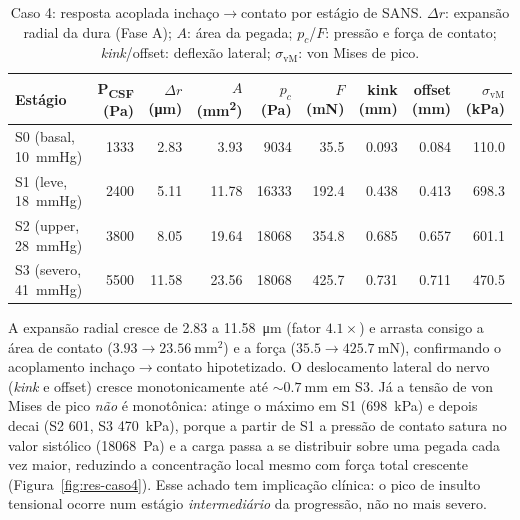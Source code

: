 \begin{table}[h!]
\centering
\small
\caption{Caso 4: resposta acoplada inchaço$\to$contato por estágio de SANS.
$\Delta r$: expansão radial da dura (Fase A); $A$: área da pegada; $p_c$/$F$:
pressão e força de contato; \emph{kink}/offset: deflexão lateral;
$\sigma_{\mathrm{vM}}$: von Mises de pico.}
\label{tab:res-caso4}
\begin{tabular}{l r r r r r r r r}
\toprule
\textbf{Estágio} & \makecell{P\textsubscript{CSF}\\(\si{\pascal})} & \makecell{$\Delta r$\\(\si{\micro\meter})} & \makecell{$A$\\(\si{\milli\meter\squared})} & \makecell{$p_c$\\(\si{\pascal})} & \makecell{$F$\\(\si{\milli\newton})} & \makecell{kink\\(\si{\milli\meter})} & \makecell{offset\\(\si{\milli\meter})} & \makecell{$\sigma_{\mathrm{vM}}$\\(\si{\kilo\pascal})} \\
\midrule
S0 (basal, \SI{10}{mmHg}) & 1333 & 2.83  & 3.93  & 9034  & 35.5  & 0.093 & 0.084 & 110.0 \\
S1 (leve, \SI{18}{mmHg})  & 2400 & 5.11  & 11.78 & 16333 & 192.4 & 0.438 & 0.413 & 698.3 \\
S2 (upper, \SI{28}{mmHg}) & 3800 & 8.05  & 19.64 & 18068 & 354.8 & 0.685 & 0.657 & 601.1 \\
S3 (severo, \SI{41}{mmHg}) & 5500 & 11.58 & 23.56 & 18068 & 425.7 & 0.731 & 0.711 & 470.5 \\
\bottomrule
\end{tabular}
\end{table}

A expansão radial cresce de \SI{2.83}{} a \SI{11.58}{\micro\meter} (fator $4.1\times$) e arrasta consigo a área de contato ($3.93 \to \SI{23.56}{\milli\meter\squared}$) e a força ($35.5 \to \SI{425.7}{\milli\newton}$), confirmando o acoplamento inchaço$\to$contato hipotetizado. O deslocamento lateral do nervo (\emph{kink} e offset) cresce monotonicamente até $\sim\SI{0.7}{\milli\meter}$ em S3. Já a tensão de von Mises de pico \emph{não} é monotônica: atinge o máximo em S1 (\SI{698}{\kilo\pascal}) e depois decai (S2 \SI{601}{}, S3 \SI{470}{\kilo\pascal}), porque a partir de S1 a pressão de contato satura no valor sistólico (\SI{18068}{\pascal}) e a carga passa a se distribuir sobre uma pegada cada vez maior, reduzindo a concentração local mesmo com força total crescente (Figura~\ref{fig:res-caso4}). Esse achado tem implicação clínica: o pico de insulto tensional ocorre num estágio \emph{intermediário} da progressão, não no mais severo.

